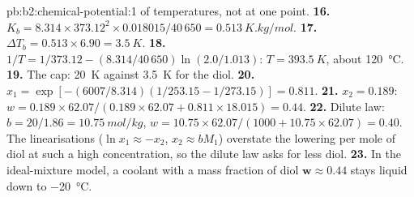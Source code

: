 \begin{solution}{pb:b2:chemical-potential:1}
of temperatures, not at one point.
\textbf{16.} $K_b = 8.314 \times 373.12^2 \times 0.018015/40\,650 =
\qty{0.513}{K.kg/mol}$.
\textbf{17.} $\Delta T_b = 0.513 \times 6.90 = \qty{3.5}{K}$.
\textbf{18.} $1/T = 1/373.12 - (8.314/40\,650)\ln(2.0/1.013)$: $T = \qty{393.5}{K}$,
about \qty{120}{\celsius}.
\textbf{19.} The cap: \qty{20}{K} against \qty{3.5}{K} for the diol.
\textbf{20.} $x_1 = \exp[-(6007/8.314)(1/253.15 - 1/273.15)] = 0.811$.
\textbf{21.} $x_2 = 0.189$: $w = 0.189 \times 62.07/(0.189 \times 62.07 + 0.811
\times 18.015) = 0.44$.
\textbf{22.} Dilute law: $b = 20/1.86 = \qty{10.75}{mol/kg}$, $w = 10.75 \times
62.07/(1000 + 10.75 \times 62.07) = 0.40$. The linearisations ($\ln x_1 \approx
-x_2$, $x_2 \approx bM_1$) overstate the lowering per mole of diol at such a
high concentration, so the dilute law asks for less diol.
\textbf{23.} In the ideal-mixture model, a coolant with a mass fraction of
diol $\boldsymbol{w \approx 0.44}$ stays liquid down to \qty{-20}{\celsius}.
\end{solution}
